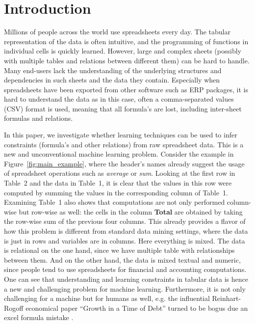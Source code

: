 \documentclass{sig-alternate-05-2015}
\begin{document}
\section{Introduction}
Millions of people across the world use spreadsheets every day. The tabular representation of the data is often intuitive, and the programming of functions in individual cells is quickly learned. However, large and complex sheets (possibly with multiple tables and relations between different them) can be hard to handle. Many end-users lack the understanding of the underlying structures and dependencies in such sheets and the data they contain. Especially when spreadsheets have been exported from
other software such as ERP packages, it is hard to understand the data as in this case,
often a comma-separated values (CSV) format is used, meaning that all formula's are lost, including inter-sheet formulas and relations.

In this paper,  we investigate whether learning techniques can be used to infer constraints (formula's and other relations) from raw spreadsheet data.
This is a new and unconventional machine learning problem.
Consider the example in Figure~\ref{fig:main_example}, where the header's names already suggest the usage of spreadsheet operations such as \textit{average} or \textit{sum}.
Looking at the first row in Table~2 and the data in Table~1, it is clear that the values in this row were computed by summing the values in the corresponding column of Table~1.
Examining Table~1 also shows that computations are not only performed column-wise but row-wise as well: the cells in the column \textbf{Total} are obtained by taking the row-wise sum of the previous four columns.
This already provides a flavor of how this problem is different from standard data mining settings, where the data is just in rows and variables are in columns. Here everything is mixed. The data is relational on the one hand, since we have multiple table with relationships between them. And on the other hand, the data is mixed textual and numeric, since people tend to use spreadsheets for financial and accounting computations. One can see that understanding and learning constraints in tabular data is hence a new and challenging problem for machine learning. Furthermore, it is not only challenging for a machine but for humans as well, e.g. the influential Reinhart-Rogoff economical paper ``Growth in a Time of Debt'' turned to be bogus due an excel formula mistake \cite{flaw_excel}.
\end{document}

